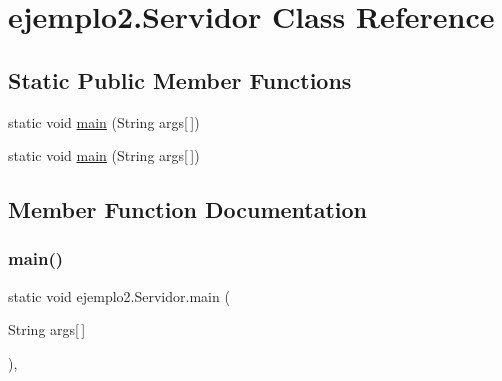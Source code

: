 \hypertarget{classejemplo2_1_1_servidor}{}\section{ejemplo2.\+Servidor Class Reference}
\label{classejemplo2_1_1_servidor}
\subsection*{Static Public Member Functions}
\begin{DoxyCompactItemize}
\item 
static void \mbox{\hyperlink{classejemplo2_1_1_servidor_aa867aa19fe8670511d9ae325b1b60be7}{main}} (String args\mbox{[}$\,$\mbox{]})
\item 
static void \mbox{\hyperlink{classejemplo2_1_1_servidor_aa867aa19fe8670511d9ae325b1b60be7}{main}} (String args\mbox{[}$\,$\mbox{]})
\end{DoxyCompactItemize}


\subsection{Member Function Documentation}
\mbox{\label{classejemplo2_1_1_servidor_aa867aa19fe8670511d9ae325b1b60be7}} 
\subsubsection{\texorpdfstring{main()}{main()}\hspace{0.1cm}{\footnotesize\ttfamily [1/2]}}
{\footnotesize\ttfamily static void ejemplo2.\+Servidor.\+main (\begin{DoxyParamCaption}\item[{String}]{args\mbox{[}$\,$\mbox{]} }\end{DoxyParamCaption})\hspace{0.3cm}{\ttfamily [inline]}, {\ttfamily [static]}}


